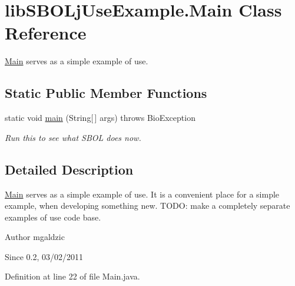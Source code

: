 \hypertarget{classlib_s_b_o_lj_use_example_1_1_main}{
\section{libSBOLjUseExample.Main Class Reference}
\label{classlib_s_b_o_lj_use_example_1_1_main}
}


\hyperlink{classlib_s_b_o_lj_use_example_1_1_main}{Main} serves as a simple example of use.  


\subsection*{Static Public Member Functions}
\begin{DoxyCompactItemize}
\item 
static void \hyperlink{classlib_s_b_o_lj_use_example_1_1_main_a59976ba97499fda22de5b3d81513db67}{main} (String\mbox{[}$\,$\mbox{]} args)  throws BioException 
\begin{DoxyCompactList}\small\item\em Run this to see what SBOL does now. \item\end{DoxyCompactList}\end{DoxyCompactItemize}


\subsection{Detailed Description}
\hyperlink{classlib_s_b_o_lj_use_example_1_1_main}{Main} serves as a simple example of use. It is a convenient place for a simple example, when developing something new. TODO: make a completely separate examples of use code base.

\begin{DoxyAuthor}{Author}
mgaldzic 
\end{DoxyAuthor}
\begin{DoxySince}{Since}
0.2, 03/02/2011 
\end{DoxySince}


Definition at line 22 of file Main.java.



